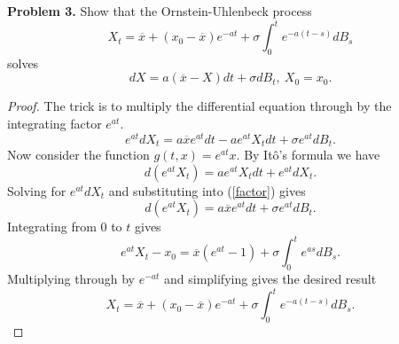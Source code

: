\documentclass[11pt,letterpaper]{report}
\begin{document}
\noindent\textbf{Problem 3. }
Show that the Ornstein-Uhlenbeck process
\[
X_t = \overline{x} + (x_0 - \overline{x})e^{-at} + \sigma\int_0^te^{-a(t-s)}dB_s
\]
solves
\[
dX = a(\overline{x}-X)dt + \sigma dB_t,\ X_0 = x_0.
\]
\begin{proof}
	The trick is to multiply the differential equation through by the integrating factor $e^{at}$.
	\begin{equation}\label{factor}
	e^{at}dX_t = a\overline{x}e^{at}dt-ae^{at}X_tdt + \sigma e^{at}dB_t.
	\end{equation}
	Now consider the function $g(t, x)= e^{at}x$. By It\^o's formula we have
	\[
	d(e^{at}X_t) = ae^{at}X_tdt + e^{at}dX_t.
	\]
	Solving for $e^{at}dX_t$ and substituting into (\ref{factor}) gives
	\[
	d(e^{at}X_t) = a\overline{x}e^{at}dt + \sigma e^{at}dB_t.
	\]
	Integrating from $0$ to $t$ gives
	\[
	e^{at}X_t - x_0 = \overline{x}(e^{at}-1) + \sigma \int_0^te^{as}dB_s.
	\]
	Multiplying through by $e^{-at}$ and simplifying gives the desired result
	\[
	X_t = \overline{x} + (x_0-\overline{x})e^{-at} + \sigma\int_0^te^{-a(t-s)}dB_s.
	\]
\end{proof}
\end{document}
